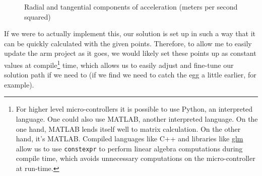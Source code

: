 \documentclass[nofoot,pdf-a,balance,colorlinks,upint,subscriptcorrection,varvw,mathalfa=cal=boondoxo]{asmeconf}
\begin{document}
        \begin{figure}[H]
            \centering

            \caption{Radial and tangential components of acceleration (meters per second squared)}\label{actuatorAccel2D}
        \end{figure}


        If we were to actually implement this, our solution is set up in such a way that it can be quickly calculated with the given points. Therefore, to allow me to easily update the arm project as it goes, we would likely set these points up as constant values at compile\footnote{For higher level micro-controllers it is possible to use Python, an interpreted language. One could also use MATLAB, another interpreted language. On the one hand, MATLAB lends itself well to matrix calculation. On the other hand, it's MATLAB. Compiled languages like C++ and libraries like \href{https://github.com/g-truc/glm}{glm} allow us to use \texttt{constexpr} to perform linear algebra computations during compile time, which avoids unnecessary computations on the micro-controller at run-time.} time, which allows us to easily adjust and fine-tune our solution path if we need to (if we find we need to catch the egg a little earlier, for example).

	
\end{document}
